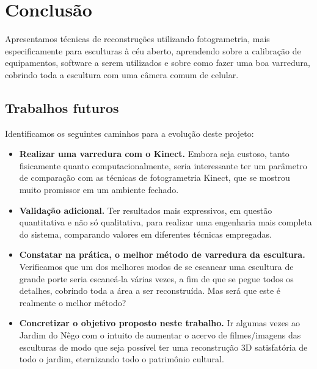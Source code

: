 \chapter{Conclusão}
Apresentamos técnicas de reconstruções utilizando fotogrametria, mais especificamente para esculturas à céu aberto, aprendendo sobre a calibração de equipamentos, software a serem utilizados e sobre como fazer uma boa varredura, cobrindo toda a escultura com uma câmera comum de celular.

\section*{Trabalhos futuros} Identificamos os seguintes caminhos para a evolução deste projeto:
\begin{itemize}
\item \textbf{Realizar uma varredura com o Kinect.} Embora seja custoso, tanto fisicamente quanto computacionalmente, seria interessante ter um parâmetro de comparação com as técnicas de fotogrametria Kinect, que se mostrou muito promissor em um ambiente fechado.
\item \textbf{Validação adicional.} Ter resultados mais expressivos, em questão quantitativa e não só qualitativa, para realizar uma engenharia mais completa do sistema, comparando valores em diferentes técnicas empregadas.
\item \textbf{Constatar na prática, o melhor método de varredura da escultura.} Verificamos que um dos melhores modos de se escanear uma escultura de grande porte seria escaneá-la várias vezes, a fim de que se pegue todos os detalhes, cobrindo toda a área a ser reconstruída. Mas será que este é realmente o melhor método? 
\item \textbf{Concretizar o objetivo proposto neste trabalho.} Ir algumas vezes ao Jardim do Nêgo com o intuito de aumentar o acervo de filmes/imagens das esculturas de modo que seja possível ter uma reconstrução 3D satisfatória de todo o jardim, eternizando todo o patrimônio cultural.
\end{itemize}
